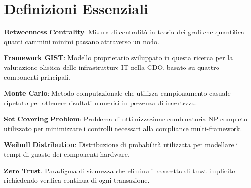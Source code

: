 \section{\texorpdfstring{Definizioni Essenziali}{D.2 - Definizioni Essenziali}}

\textbf{Betweenness Centrality}: Misura di centralità in teoria dei grafi che quantifica quanti cammini minimi passano attraverso un nodo.

\textbf{Framework GIST}: Modello proprietario sviluppato in questa ricerca per la valutazione olistica delle infrastrutture IT nella GDO, basato su quattro componenti principali.

\textbf{Monte Carlo}: Metodo computazionale che utilizza campionamento casuale ripetuto per ottenere risultati numerici in presenza di incertezza.

\textbf{Set Covering Problem}: Problema di ottimizzazione combinatoria NP-completo utilizzato per minimizzare i controlli necessari alla compliance multi-framework.

\textbf{Weibull Distribution}: Distribuzione di probabilità utilizzata per modellare i tempi di guasto dei componenti hardware.

\textbf{Zero Trust}: Paradigma di sicurezza che elimina il concetto di trust implicito richiedendo verifica continua di ogni transazione.

